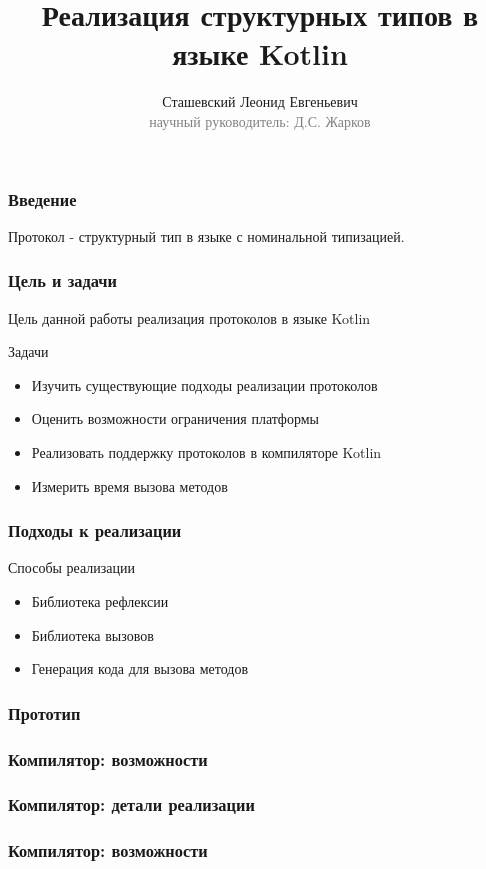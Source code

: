 \documentclass{beamer}
\begin{document}
\title[Структурный типы в языке Kotlin]{Реализация структурных типов в языке Kotlin}
\author[Сташевский Л.Е.]{Сташевский Леонид Евгеньевич\\{\footnotesize\textcolor{gray}{научный руководитель: Д.С. Жарков}}}
\frame{\titlepage}

\begin{frame}\frametitle{Введение}
Протокол - структурный тип в языке с номинальной типизацией.
\end{frame}

\begin{frame}\frametitle{Цель и задачи}
Цель данной работы реализация протоколов в языке Kotlin

Задачи 
\begin{itemize}
    \item Изучить существующие подходы реализации протоколов
    \item Оценить возможности ограничения платформы
    \item Реализовать поддержку протоколов в компиляторе Kotlin
    \item Измерить время вызова методов
\end{itemize}
\end{frame}

\begin{frame}\frametitle{Подходы к реализации}
Способы реализации
\begin{itemize}
    \item Библиотека рефлексии
    \item Библиотека вызовов
    \item Генерация кода для вызова методов
\end{itemize}
\end{frame}

\begin{frame}\frametitle{Прототип}
\end{frame}

\begin{frame}\frametitle{Компилятор: возможности}
\end{frame}

\begin{frame}\frametitle{Компилятор: детали реализации}
\end{frame}

\begin{frame}\frametitle{Компилятор: возможности}
\end{frame}
\end{document}
